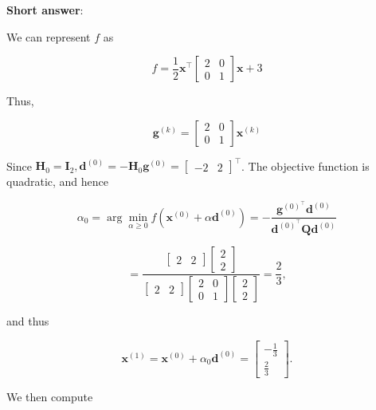 \textbf{Short answer}:

We can represent \(f\) as

\[
	f=\frac{1}{2} \boldsymbol{x}^{\top}\left[\begin{array}{ll}
		2 & 0 \\
		0 & 1
	\end{array}\right] \boldsymbol{x}+3
\]

Thus,

\[
	\boldsymbol{g}^{(k)}=\left[\begin{array}{ll}
		2 & 0 \\
		0 & 1
	\end{array}\right] \boldsymbol{x}^{(k)}
\]

Since \(\boldsymbol{H}_{0}=\boldsymbol{I}_{2}, \boldsymbol{d}^{(0)}=-\boldsymbol{H}_{0} \boldsymbol{g}^{(0)}=\left[\begin{array}{ll}-2 & 2\end{array}\right]^{\top}\). The objective function is quadratic, and hence

\[
	\alpha_{0}=\arg \min _{\alpha \geq 0} f\left(\boldsymbol{x}^{(0)}+\alpha \boldsymbol{d}^{(0)}\right)=-\frac{\boldsymbol{g}^{(0)^{\top}} \boldsymbol{d}^{(0)}}{\boldsymbol{d}^{(0)^{\top}} \boldsymbol{Q} \boldsymbol{d}^{(0)}}
\]

\[
	=\frac{\left[\begin{array}{ll}
			2 & 2
		\end{array}\right]\left[\begin{array}{l}
			2 \\
			2
		\end{array}\right]}{\left[\begin{array}{ll}
			2 & 2
		\end{array}\right]\left[\begin{array}{ll}
			2 & 0 \\
			0 & 1
		\end{array}\right]\left[\begin{array}{l}
			2 \\
			2
		\end{array}\right]}=\frac{2}{3},
\]

and thus

\[
	\boldsymbol{x}^{(1)}=\boldsymbol{x}^{(0)}+\alpha_{0} \boldsymbol{d}^{(0)}=\left[\begin{array}{c}
		-\frac{1}{3} \\
		\frac{2}{3}
	\end{array}\right] .
\]

We then compute

